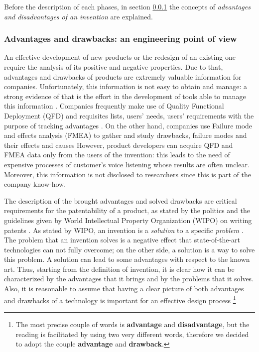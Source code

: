 \documentclass[]{book}
\let\rmarkdownfootnote\footnote%
\def\footnote{\protect\rmarkdownfootnote}
\begin{document}
Before the description of each phases, in section \ref{advdisdef} the
concepts of \emph{advantages and disadvantages of an invention} are
explained.

\subsubsection{Advantages and drawbacks: an engineering point of
view}\label{advdisdef}

An effective development of new products or the redesign of an existing
one require the analysis of its positive and negative properties. Due to
that, advantages and drawbacks of products are extremely valuable
information for companies. Unfortunately, this information is not easy
to obtain and manage: a strong evidence of that is the effort in the
development of tools able to manage this information
\citep[\citet{ulrich2003product}]{pahl2013engineering}. Companies
frequently make use of Quality Functional Deployment (QFD) and
requisites lists, users' needs, users' requirements with the purpose of
tracking advantages \citep{carnevalli2008review}. On the other hand,
companies use Failure mode and effects analysis (FMEA) to gather and
study drawbacks, failure modes and their effects and causes
\citep{liu2013risk} However, product developers can acquire QFD and FMEA
data only from the users of the invention: this leads to the need of
expensive processes of customer's voice listening whose results are
often unclear. Moreover, this information is not disclosed to
researchers since this is part of the company know-how.

The description of the brought advantages and solved drawbacks are
critical requirements for the patentability of a product, as stated by
the politics and the guidelines given by World Intellectual Property
Organization (WIPO) on writing patents \citep{world2004wipo}. As stated
by WIPO, an invention is a \emph{solution} to a specific \emph{problem}
. The problem that an invention solves is a negative effect that
state-of-the-art technologies can not fully overcome; on the other side,
a solution is a way to solve this problem. A solution can lead to some
advantages with respect to the known art. Thus, starting from the
definition of invention, it is clear how it can be characterized by the
advantages that it brings and by the problems that it solves. Also, it
is reasonable to assume that having a clear picture of both advantages
and drawbacks of a technology is important for an effective design
process \footnote{The most precise couple of words is \textbf{advantage}
  and \textbf{disadvantage}, but the reading is facilitated by using two
  very different words, therefore we decided to adopt the couple
  \textbf{advantage} and \textbf{drawback}.}
\end{document}
